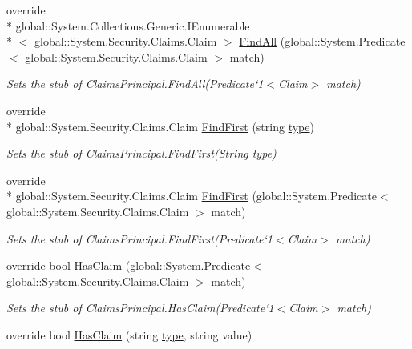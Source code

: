 \begin{DoxyCompactItemize}
override \\*
global\-::\-System.\-Collections.\-Generic.\-I\-Enumerable\\*
$<$ global\-::\-System.\-Security.\-Claims.\-Claim $>$ \hyperlink{class_system_1_1_security_1_1_principal_1_1_fakes_1_1_stub_windows_principal_ab33308ae6d8f003ee916a3b8b2e16c86}{Find\-All} (global\-::\-System.\-Predicate$<$ global\-::\-System.\-Security.\-Claims.\-Claim $>$ match)
\begin{DoxyCompactList}\small\item\em Sets the stub of Claims\-Principal.\-Find\-All(Predicate`1$<$Claim$>$ match)\end{DoxyCompactList}\item 
override \\*
global\-::\-System.\-Security.\-Claims.\-Claim \hyperlink{class_system_1_1_security_1_1_principal_1_1_fakes_1_1_stub_windows_principal_ac8f2f93381f5edebb8ad38bbc6ef4c62}{Find\-First} (string \hyperlink{jquery-1_810_82-vsdoc_8js_a3940565e83a9bfd10d95ffd27536da91}{type})
\begin{DoxyCompactList}\small\item\em Sets the stub of Claims\-Principal.\-Find\-First(\-String type)\end{DoxyCompactList}\item 
override \\*
global\-::\-System.\-Security.\-Claims.\-Claim \hyperlink{class_system_1_1_security_1_1_principal_1_1_fakes_1_1_stub_windows_principal_a8d2102208e80a25412444a1a06d8ae8e}{Find\-First} (global\-::\-System.\-Predicate$<$ global\-::\-System.\-Security.\-Claims.\-Claim $>$ match)
\begin{DoxyCompactList}\small\item\em Sets the stub of Claims\-Principal.\-Find\-First(Predicate`1$<$Claim$>$ match)\end{DoxyCompactList}\item 
override bool \hyperlink{class_system_1_1_security_1_1_principal_1_1_fakes_1_1_stub_windows_principal_a000cb12c988ef0f055dffe56da80d4b7}{Has\-Claim} (global\-::\-System.\-Predicate$<$ global\-::\-System.\-Security.\-Claims.\-Claim $>$ match)
\begin{DoxyCompactList}\small\item\em Sets the stub of Claims\-Principal.\-Has\-Claim(Predicate`1$<$Claim$>$ match)\end{DoxyCompactList}\item 
override bool \hyperlink{class_system_1_1_security_1_1_principal_1_1_fakes_1_1_stub_windows_principal_a868ac6a7dd39f28c31931b93e1288186}{Has\-Claim} (string \hyperlink{jquery-1_810_82-vsdoc_8js_a3940565e83a9bfd10d95ffd27536da91}{type}, string value)

\end{DoxyCompactItemize}
